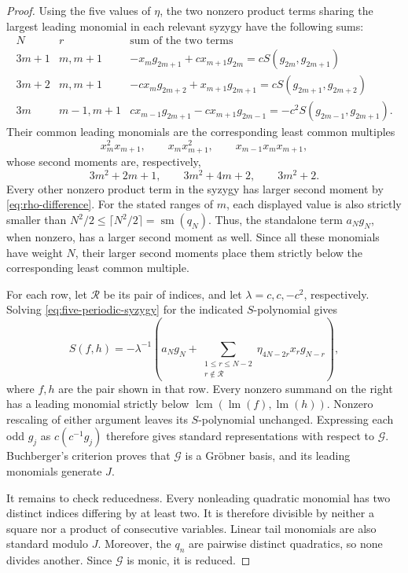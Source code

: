 \documentclass[11pt,reqno]{amsart}
\theoremstyle{definition}
\theoremstyle{remark}
\theoremstyle{plain}
\newcommand{\lm}{\operatorname{lm}}
\newcommand{\smom}{\operatorname{sm}}
\begin{document}
\begin{proof}
Using the five values of \(\eta\), the two nonzero product terms
sharing the largest leading monomial in each relevant syzygy
have the following sums:
$$
\begin{array}{c|c|l}
 N&r&\text{sum of the two terms}\\ \hline
 3m+1&m,m+1&
 -x_mg_{2m+1}+cx_{m+1}g_{2m}
 =cS(g_{2m},g_{2m+1})\\[2pt]
 3m+2&m,m+1&
 -cx_mg_{2m+2}+x_{m+1}g_{2m+1}
 =cS(g_{2m+1},g_{2m+2})\\[2pt]
 3m&m-1,m+1&
 cx_{m-1}g_{2m+1}-cx_{m+1}g_{2m-1}
 =-c^2S(g_{2m-1},g_{2m+1}).
\end{array}
$$
Their common leading monomials are the corresponding least common
multiples
$$
 x_m^2x_{m+1},\qquad
 x_mx_{m+1}^2,\qquad
 x_{m-1}x_mx_{m+1},
$$
whose second moments are, respectively,
$$
 3m^2+2m+1,\qquad
 3m^2+4m+2,\qquad
 3m^2+2.
$$
Every other nonzero product term in the syzygy has larger second
moment by \eqref{eq:rho-difference}.  For the stated ranges of \(m\),
each displayed value is also strictly smaller than
\(N^2/2\leq\lceil N^2/2\rceil=\smom(q_N)\).
Thus, the standalone term \(a_Ng_N\), when nonzero, has a larger second
moment as well.  Since all these monomials have weight \(N\), their
larger second moments place them strictly below the corresponding
least common multiple.

For each row, let \(\mathcal R\) be its pair of indices, and let
\(\lambda=c,c,-c^2\), respectively.  Solving
\eqref{eq:five-periodic-syzygy} for the indicated \(S\)-polynomial
gives
$$
 S(f,h)=-\lambda^{-1}\left(
 a_Ng_N+
 \sum_{\substack{1\leq r\leq N-2\\r\notin\mathcal R}}
 \eta_{4N-2r}x_rg_{N-r}\right),
$$
where \(f,h\) are the pair shown in that row.  Every nonzero summand
on the right has a leading monomial strictly below
\(\operatorname{lcm}(\lm(f),\lm(h))\).
Nonzero rescaling of either argument leaves its \(S\)-polynomial
unchanged.  Expressing each odd \(g_j\) as \(c(c^{-1}g_j)\) therefore
gives standard representations with respect to \(\mathcal G\).
Buchberger's criterion proves that \(\mathcal G\) is a Gr\"obner
basis, and its leading monomials generate \(J\).

It remains to check reducedness.  Every nonleading quadratic
monomial has two distinct indices differing by at least two.
It is therefore divisible by neither a square nor a product of
consecutive variables.  Linear tail monomials are also standard
modulo \(J\).  Moreover, the \(q_n\) are pairwise distinct quadratics,
so none divides another.  Since \(\mathcal G\) is monic, it is
reduced.
\end{proof}
\end{document}
